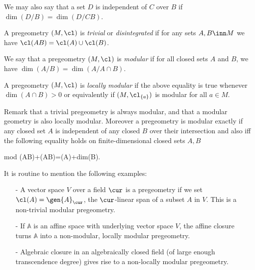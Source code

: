 We may also say that a set $D$ is independent of $C$ over $B$ if $\dim(D/B)=\dim(D/CB)$.
\begin{dfn}
A pregeometry $(M,\cl)$ is {\em trivial} or {\em disintegrated} if for any sets $A,B\inn M$ we have $\cl(AB)=\cl(A)\cup\cl(B)$.

We say that a pregeometry $(M,\cl)$ is {\em modular} if for all closed sets $A$ and $B$, we have
$\dim(A/B)=\dim(A/A\cap B)$.

A pregeometry $(M,\cl)$ is {\em locally modular} if the above equality is true whenever $\dim(A\cap B)>0$
or equivalently if $(M,\cl_{\{a\}})$ is modular for all $a\in M$.
\end{dfn}
Remark that a trivial pregeometry is always modular, and that a modular geometry is also
locally modular. Moreover a pregeometry is modular exactly if any closed set $A$ is independent of any closed $B$
over their intersection and also iff the following equality holds on finite-dimensional closed sets $A,B$
\begin{labeq}{mod}
\dim(AB)+\dim(A\cap B)=\dim(A)+dim(B).
\end{labeq}

It is routine to mention the following examples:
\begin{itemize}
\item[-]A vector space $V$ over a field $\cur$ is a pregeometry if we set $\cl(A)=\gen{A}_{\cur}$,
the $\cur$-linear span of a subset $A$ in $V$. This is a non-trivial modular pregeometry.

\item[-]If $\mathbb{A}$ is an affine space with underlying vector space $V$, the affine closure
turns $\mathbb{A}$ into a non-modular, locally modular pregeometry.

\item[-]Algebraic closure in an algebraically closed field (of large enough transcendence degree)
gives rise to a non-locally modular pregeometry.
\end{itemize}

